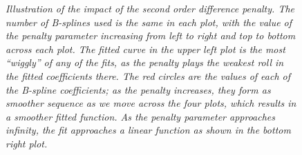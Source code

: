 \documentclass[12pt]{article}
\theoremstyle{definition}
\begin{document}
\begin{figure}[H]
\begin{subfigure}{.5\textwidth}
  \label{fig:pspline_small_lambda}
\end{subfigure}
\caption{\textit{Illustration of the impact of the second order difference penalty. The number of B-splines used is the same in each plot, with the value of the penalty parameter increasing from left to right and top to bottom across each plot. The fitted curve in the upper left plot is the most ``wiggly'' of any of the fits, as the penalty plays the weakest roll in the fitted coefficients there. The red circles are the values of each of the B-spline coefficients; as the penalty increases, they form as smoother sequence as we move across the four plots, which results in a smoother fitted function. As the penalty parameter approaches infinity, the fit approaches a linear function as shown in the bottom right plot.}}
\label{fig:second-ord-PS-pen-SML-lambda}
\end{figure}



%
%
\end{document}
